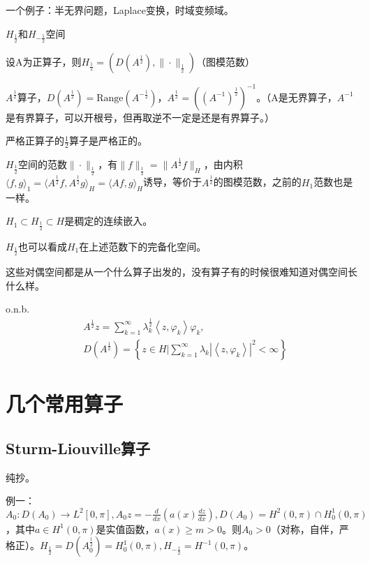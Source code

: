 一个例子：半无界问题，Laplace变换，时域变频域。

$H_{\frac{1}{2}}$和$H_{-\frac{1}{2}}$空间

设A为正算子，则$H_{\frac{1}{2}} = (D(A^{\frac{1}{2}}), \|\cdot\|_{\frac{1}{2}})$（图模范数）

$A^{\frac{1}{2}}$算子，$D(A^{\frac{1}{2}}) = \text{Range}(A^{-\frac{1}{2}})$，$A^{\frac{1}{2}} = {({({A}^{-1})}^{\frac{1}{2}})}^{-1}$。（A是无界算子，$A^{-1}$是有界算子，可以开根号，但再取逆不一定是还是有界算子。）

严格正算子的$\frac{1}{2}$算子是严格正的。

$H_{\frac{1}{2}}$空间的范数$\|\cdot\|_{\frac{1}{2}}$，有$\|f\|_{\frac{1}{2}} = \|A^{\frac{1}{2}}f\|_H$，由内积$\langle f, g \rangle_1 = \langle A^{\frac{1}{2}}f, A^{\frac{1}{2}}g \rangle_H = \langle Af, g \rangle_H$诱导，等价于$A^{\frac{1}{2}}$的图模范数，之前的$H_1$范数也是一样。

$H_1 \subset H_{\frac{1}{2}} \subset H$是稠定的连续嵌入。

$H_\frac{1}{2}$也可以看成$H_1$在上述范数下的完备化空间。

这些对偶空间都是从一个什么算子出发的，没有算子有的时候很难知道对偶空间长什么样。

o.n.b.
\[
  \begin{aligned}
    &A^{\frac{1}{2}} z=\sum_{k=1}^{\infty} \lambda_{k}^{\frac{1}{2}}\left\langle z, \varphi_{k}\right\rangle \varphi_{k}, \\
    &D\left(A^{\frac{1}{2}}\right)=\left\{z \in H\bigg|\sum_{k=1}^{\infty} \lambda_{k}|\left\langle z, \varphi_{k}\right\rangle|^{2}<\infty\right\}
  \end{aligned}
\]

\section{几个常用算子}

\subsection{Sturm-Liouville算子}

纯抄。

例一：$A_{0}: D\left(A_{0}\right) \to L^{2}[0, \pi], A_{0} z=-\frac{d}{d x}\left(a(x) \frac{d z}{d x}\right), D\left(A_{0}\right)=H^{2}(0, \pi) \cap H_{0}^{1}(0, \pi)$，其中$a \in H^{1}(0, \pi)$是实值函数，$a(x) \geq m>0$。则$A_{0}>0$（对称，自伴，严格正）。$H_{\frac{1}{2}}=D\left(A_{0}^{\frac{1}{2}}\right)=H_{0}^{1}(0, \pi), H_{-\frac{1}{2}}=H^{-1}(0, \pi)$。

